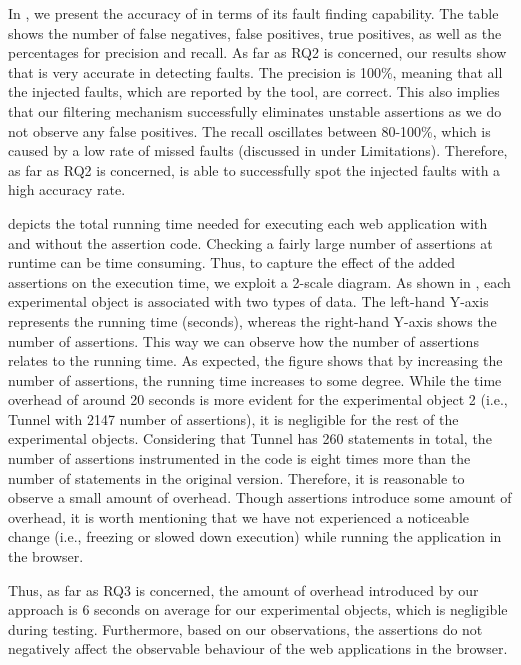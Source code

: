 In , we present the accuracy of \jsart in terms of its fault finding capability. 
The table shows the number of false negatives, false positives, true positives, as well as the percentages for precision and recall. As far as RQ2 is concerned, our results show that 
\jsart is very accurate in detecting faults. The precision is 100\%, meaning that all the injected faults, which are 
reported by the tool, are correct. This also implies that our filtering mechanism successfully eliminates unstable assertions as we do not observe any false positives. 
The recall oscillates between 80-100\%, which is caused by a low rate of  missed 
faults (discussed in  under Limitations).
Therefore, as far as RQ2 is concerned, \jsart is able to successfully spot the injected faults with a  high accuracy rate.

  depicts the total running time needed for executing each web application with and without 
the assertion code. Checking a fairly large number of assertions at runtime can be time consuming. Thus, to capture the effect of the added assertions on the execution time, we exploit a 2-scale diagram. As shown in , each experimental object is associated with two types of data. The left-hand Y-axis represents the running time (seconds), whereas the right-hand Y-axis shows the number of assertions.  This way we can observe how the number of assertions relates to the running time. As expected, the figure shows that by increasing the number of assertions, the running time increases to some degree. While the time overhead of around 20 seconds is more evident for the experimental object 2 (i.e., Tunnel with 2147 number of assertions), it is negligible for the rest of the experimental objects. Considering 
that Tunnel has 260 statements in total, the number of assertions instrumented in the code is eight times more than the number of statements in the 
original version. Therefore, it is reasonable to observe a small amount of overhead. Though assertions introduce some amount of overhead, 
it is worth mentioning that we have not experienced a noticeable change (i.e., freezing or slowed down execution) while running the application in the browser. 

Thus, as far as RQ3 is concerned, the amount of overhead introduced by our approach is 6 seconds on average for our experimental objects, which
is negligible during testing. %
Furthermore, based on our observations, the assertions do not negatively affect the observable behaviour of the web applications in the browser.

